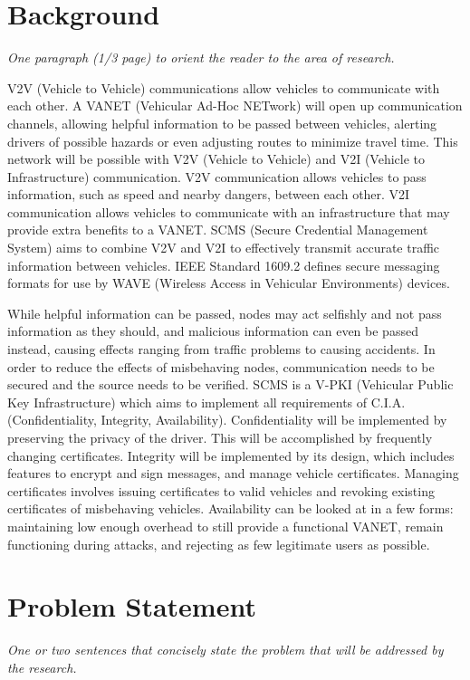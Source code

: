 \documentclass [11pt]{article}
\newcommand{\sechint}[1]{\small{\emph{#1}} \bigskip}
\begin{document}
\tableofcontents
\pagebreak

\section{Background}{\sechint{One paragraph (1/3 page) to orient the reader to the area of research.}}

V2V (Vehicle to Vehicle) communications allow vehicles to communicate with each other. A VANET (Vehicular Ad-Hoc NETwork) will open up communication channels, allowing helpful information to be passed between vehicles, alerting drivers of possible hazards or even adjusting routes to minimize travel time. This network will be possible with V2V (Vehicle to Vehicle) and V2I (Vehicle to Infrastructure) communication. V2V communication allows vehicles to pass information, such as speed and nearby dangers, between each other. V2I communication allows vehicles to communicate with an infrastructure that may provide extra benefits to a VANET. SCMS (Secure Credential Management System) aims to combine V2V and V2I to effectively transmit accurate traffic information between vehicles. IEEE Standard 1609.2 defines secure messaging formats for use by WAVE (Wireless Access in Vehicular Environments) devices.

While helpful information can be passed, nodes may act selfishly and not pass information as they should, and malicious information can even be passed instead, causing effects ranging from traffic problems to causing accidents. In order to reduce the effects of misbehaving nodes, communication needs to be secured and the source needs to be verified. SCMS is a V-PKI (Vehicular Public Key Infrastructure) which aims to implement all requirements of C.I.A. (Confidentiality, Integrity, Availability). Confidentiality will be implemented by preserving the privacy of the driver. This will be accomplished by frequently changing certificates. Integrity will be implemented by its design, which includes features to encrypt and sign messages, and manage vehicle certificates. Managing certificates involves issuing certificates to valid vehicles and revoking existing certificates of misbehaving vehicles. Availability can be looked at in a few forms: maintaining low enough overhead to still provide a functional VANET, remain functioning during attacks, and rejecting as few legitimate users as possible.

\section{Problem Statement}{\sechint{One or two sentences that concisely state the problem that will be addressed by the research.}}
\end{document}
